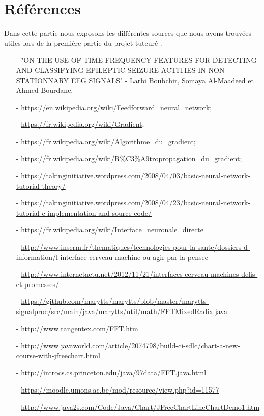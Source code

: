 \part{Références} %
\label{prt:référence_}
Dans cette partie nous exposons les différentes sources que nous avons trouvées utiles lors de la première partie du projet tuteuré .

\begin{itemize}
	\item [-] "ON THE USE OF TIME-FREQUENCY FEATURES FOR DETECTING AND CLASSIFYING EPILEPTIC SEIZURE ACTITIES IN NON-STATIONNARY EEG SIGNALS" - Larbi Boubchir, Somaya Al-Maadeed et Ahmed Bourdane. 
  	\item [-] \url{https://en.wikipedia.org/wiki/Feedforward_neural_network;}
  	\item [-] \url{https://fr.wikipedia.org/wiki/Gradient;}
  	\item [-] \url{https://fr.wikipedia.org/wiki/Algorithme_du_gradient;}
  	\item [-] \url{https://fr.wikipedia.org/wiki/R\%C3\%A9tropropagation_du_gradient;}
  	\item [-] \url{https://takinginitiative.wordpress.com/2008/04/03/basic-neural-network-tutorial-theory/}
  	\item [-] \url{https://takinginitiative.wordpress.com/2008/04/23/basic-neural-network-tutorial-c-implementation-and-source-code/}
  	\item [-] \url{https://fr.wikipedia.org/wiki/Interface_neuronale_directe}
  	\item [-] \url{http://www.inserm.fr/thematiques/technologies-pour-la-sante/dossiers-d-information/l-interface-cerveau-machine-ou-agir-par-la-pensee}
  	\item [-] \url{http://www.internetactu.net/2012/11/21/interfaces-cerveau-machines-defis-et-promesses/}
  	\item [-] \url{https://github.com/marytts/marytts/blob/master/marytts-signalproc/src/main/java/marytts/util/math/FFTMixedRadix.java}
  	\item [-] \url{http://www.tangentex.com/FFT.htm}
  	\item [-] \url{http://www.javaworld.com/article/2074798/build-ci-sdlc/chart-a-new-course-with-jfreechart.html}
  	\item [-] \url{http://introcs.cs.princeton.edu/java/97data/FFT.java.html}
  	\item [-] \url{https://moodle.umons.ac.be/mod/resource/view.php?id=11577}
  	\item [-] \url{http://www.java2s.com/Code/Java/Chart/JFreeChartLineChartDemo1.htm}

\end{itemize}
